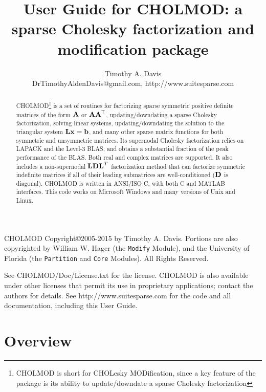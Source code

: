 \documentclass[11pt]{article}
\newcommand{\m}[1]{{\bf{#1}}}       %
\newcommand{\tr}{^{\sf T}}          %
\begin{document}
\author{Timothy A. Davis \\
DrTimothyAldenDavis@gmail.com, http://www.suitesparse.com }
\title{User Guide for CHOLMOD: a sparse Cholesky factorization and
modification package}


\maketitle

\begin{abstract}
    CHOLMOD\footnote{CHOLMOD is short for CHOLesky MODification,
    since a key feature of the package is its ability to update/downdate
    a sparse Cholesky factorization}
    is a set of routines for factorizing sparse symmetric positive
    definite matrices of the form $\m{A}$ or $\m{AA}\tr$, updating/downdating
    a sparse Cholesky factorization, solving linear systems, updating/downdating
    the solution to the triangular system $\m{Lx}=\m{b}$, and many other sparse
    matrix functions for both symmetric and unsymmetric matrices.
    Its supernodal Cholesky factorization
    relies on LAPACK and the Level-3 BLAS, and obtains a substantial fraction
    of the peak performance of the BLAS.  Both real and complex matrices
    are supported.  
    It also includes a non-supernodal $\m{LDL}^T$ factorization method
    that can factorize symmetric indefinite matrices if all of their
    leading submatrices are well-conditioned ($\m{D}$ is diagonal).
    CHOLMOD is written in ANSI/ISO C, with both
    C and MATLAB interfaces.  This code works on Microsoft Windows and many versions
    of Unix and Linux.
\end{abstract}

CHOLMOD Copyright\copyright 2005-2015 by Timothy A. Davis.  Portions are also
copyrighted by William W. Hager (the {\tt Modify} Module),
and the University of Florida (the {\tt Partition} and {\tt Core} Modules).
All Rights Reserved.

See CHOLMOD/Doc/License.txt for the license.
CHOLMOD is also available under other licenses that permit its use in
proprietary applications; contact the authors for details.
See http://www.suitesparse.com for the code and all documentation,
including this User Guide.

\newpage
\tableofcontents

\newpage \section{Overview}
\end{document}

